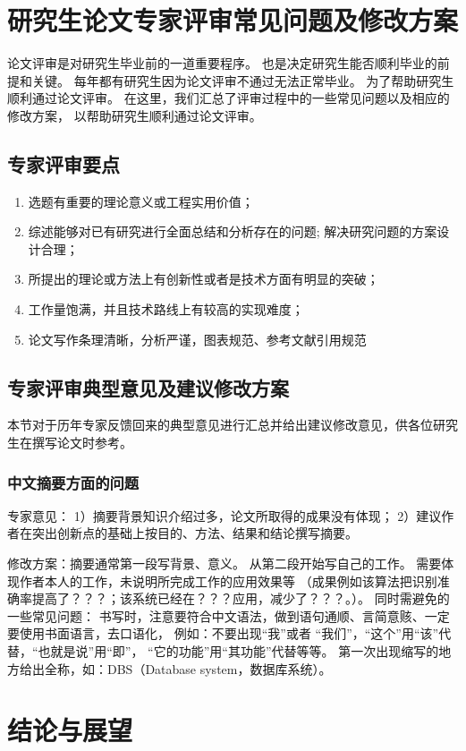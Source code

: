 \documentclass[12pt]{zjutbook}
\begin{document}
\chapter{研究生论文专家评审常见问题及修改方案}
论文评审是对研究生毕业前的一道重要程序。
也是决定研究生能否顺利毕业的前提和关键。
每年都有研究生因为论文评审不通过无法正常毕业。
为了帮助研究生顺利通过论文评审。
在这里，我们汇总了评审过程中的一些常见问题以及相应的修改方案，
以帮助研究生顺利通过论文评审。

\section{专家评审要点}
\begin{enumerate}
  \item 选题有重要的理论意义或工程实用价值；
  \item 综述能够对已有研究进行全面总结和分析存在的问题; 解决研究问题的方案设计合理；
  \item 所提出的理论或方法上有创新性或者是技术方面有明显的突破；
  \item 工作量饱满，并且技术路线上有较高的实现难度；
  \item 论文写作条理清晰，分析严谨，图表规范、参考文献引用规范
\end{enumerate}
\section{专家评审典型意见及建议修改方案}
本节对于历年专家反馈回来的典型意见进行汇总并给出建议修改意见，供各位研究生在撰写论文时参考。
\subsection{中文摘要方面的问题}
专家意见：
1）摘要背景知识介绍过多，论文所取得的成果没有体现；
2）建议作者在突出创新点的基础上按目的、方法、结果和结论撰写摘要。

修改方案：摘要通常第一段写背景、意义。
从第二段开始写自己的工作。
需要体现作者本人的工作，未说明所完成工作的应用效果等
（成果例如该算法把识别准确率提高了？？？；该系统已经在？？？应用，减少了？？？。）。
同时需避免的一些常见问题：
书写时，注意要符合中文语法，做到语句通顺、言简意赅、一定要使用书面语言，去口语化，
例如：不要出现“我”或者 “我们”，“这个”用“该”代替，“也就是说”用“即”，
“它的功能”用“其功能”代替等等。
第一次出现缩写的地方给出全称，如：DBS（Database system，数据库系统）。

\chapter{结论与展望}
\end{document}
